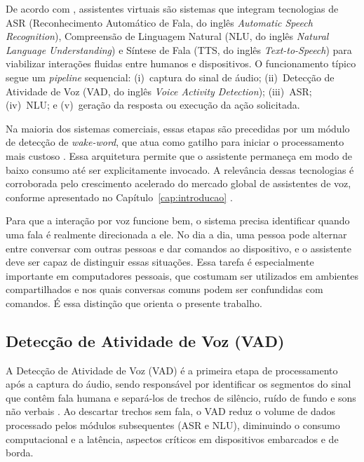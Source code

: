 \documentclass[
    12pt,                %
    openright,           %
    oneside,             %
    a4paper,             %
    english,             %
    brazil               %
]{abntex2}
\begin{document}
De acordo com , assistentes virtuais são sistemas que integram tecnologias de ASR (Reconhecimento Automático de Fala, do inglês \textit{Automatic Speech Recognition}), Compreensão de Linguagem Natural (NLU, do inglês \textit{Natural Language Understanding}) e Síntese de Fala (TTS, do inglês \textit{Text-to-Speech}) para viabilizar interações fluidas entre humanos e dispositivos. O funcionamento típico segue um \textit{pipeline} sequencial: (i)~captura do sinal de áudio; (ii)~Detecção de Atividade de Voz (VAD, do inglês \textit{Voice Activity Detection}); (iii)~ASR; (iv)~NLU; e (v)~geração da resposta ou execução da ação solicitada.

Na maioria dos sistemas comerciais, essas etapas são precedidas por um módulo de detecção de \textit{wake-word}, que atua como gatilho para iniciar o processamento mais custoso \cite{Garg2021}. Essa arquitetura permite que o assistente permaneça em modo de baixo consumo até ser explicitamente invocado. A relevância dessas tecnologias é corroborada pelo crescimento acelerado do mercado global de assistentes de voz, conforme apresentado no Capítulo~\ref{cap:introducao} \cite{NMSC2025}.

Para que a interação por voz funcione bem, o sistema precisa identificar quando uma fala é realmente direcionada a ele. No dia a dia, uma pessoa pode alternar entre conversar com outras pessoas e dar comandos ao dispositivo, e o assistente deve ser capaz de distinguir essas situações. Essa tarefa é especialmente importante em computadores pessoais, que costumam ser utilizados em ambientes compartilhados e nos quais conversas comuns podem ser confundidas com comandos. É essa distinção que orienta o presente trabalho.


\subsection{Detecção de Atividade de Voz (VAD)}

A Detecção de Atividade de Voz (VAD) é a primeira etapa de processamento após a captura do áudio, sendo responsável por identificar os segmentos do sinal que contêm fala humana e separá-los de trechos de silêncio, ruído de fundo e sons não verbais \cite{Li2021}. Ao descartar trechos sem fala, o VAD reduz o volume de dados processado pelos módulos subsequentes (ASR e NLU), diminuindo o consumo computacional e a latência, aspectos críticos em dispositivos embarcados e de borda.
\end{document}
